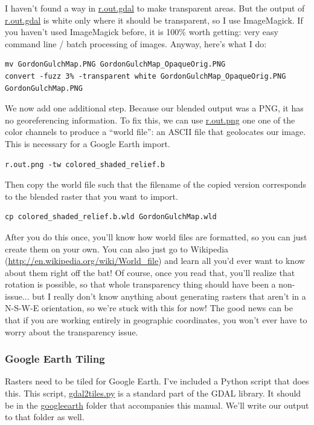 \documentclass{book}
\begin{document}
I haven't found a way in \url{r.out.gdal} to make transparent areas. But the output of \url{r.out.gdal} is white only where it should be transparent, so I use ImageMagick. If you haven't used ImageMagick before, it is 100\% worth getting: very easy command line / batch processing of images. Anyway, here's what I do:
\begin{lstlisting}
mv GordonGulchMap.PNG GordonGulchMap_OpaqueOrig.PNG
convert -fuzz 3% -transparent white GordonGulchMap_OpaqueOrig.PNG GordonGulchMap.PNG
\end{lstlisting}

We now add one additional step. Because our blended output was a PNG, it has no georeferencing information. To fix this, we can use \url{r.out.png} one one of the color channels to produce a ``world file'': an ASCII file that geolocates our image. This is necessary for a Google Earth import.
\begin{lstlisting}
r.out.png -tw colored_shaded_relief.b
\end{lstlisting}
Then copy the world file such that the filename of the copied version corresponds to the blended raster that you want to import.
\begin{lstlisting}
cp colored_shaded_relief.b.wld GordonGulchMap.wld
\end{lstlisting}
After you do this once, you'll know how world files are formatted, so you can just create them on your own. You can also just go to Wikipedia (\url{http://en.wikipedia.org/wiki/World_file}) and learn all you'd ever want to know about them right off the bat! Of course, once you read that, you'll realize that rotation is possible, so that whole transparency thing should have been a non-issue... but I really don't know anything about generating rasters that aren't in a N-S-W-E orientation, so we're stuck with this for now! The good news can be that if you are working entirely in geographic coordinates, you won't ever have to worry about the transparency issue.

\subsubsection{Google Earth Tiling}

Rasters need to be tiled for Google Earth. I've included a Python script that does this. This script, \url{gdal2tiles.py} is a standard part of the GDAL library. It should be in the \url{googleearth} folder that accompanies this manual. We'll write our output to that folder as well.
\end{document}
